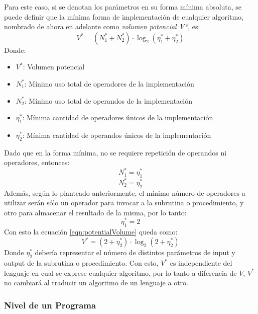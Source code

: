 \documentclass[letterpaper,12pt]{article}
\begin{document}
Para este caso, si se denotan los parámetros en su forma mínima absoluta, se puede definir que la mínima forma de implementación de cualquier algoritmo, nombrado de ahora en adelante como \textit{volumen potencial V*}, es:
\begin{equation}
  \label{eqn:potentialVolume}
  V^{*} = (N_{1}^{*} + N_{2}^{*}) \cdot \log_{2}(\eta_{1}^{*} + \eta_{2}^{*})
\end{equation}
Donde:
\begin{itemize}
  \item $V^{*}$: Volumen potencial
  \item $N_{1}^{*}$: Mínimo uso total de operadores de la implementación
  \item $N_{2}^{*}$: Mínimo uso total de operandos de la implementación
  \item $\eta_{1}^{*}$: Mínima cantidad de operadores únicos de la implementación
  \item $\eta_{2}^{*}$: Mínima cantidad de operandos únicos de la implementación
\end{itemize}
Dado que en la forma mínima, no se requiere repetición de operandos ni operadores, entonces:
\begin{equation*}
  N_{1}^{*} = \eta_{1}^{*}
\end{equation*}
\begin{equation*}
  N_{2}^{*} = \eta_{2}^{*}
\end{equation*}
Además, según lo planteado anteriormente, el mínimo número de operadores a utilizar serán sólo un operador para invocar a la subrutina o procedimiento, y otro para almacenar el resultado de la misma, por lo tanto:
\begin{equation*}
  \eta_{1}^{*} = 2
\end{equation*}
Con esto la ecuación \ref{eqn:potentialVolume} queda como:
\begin{equation}
  V^{*} = (2 + \eta_{2}^{*}) \cdot \log_{2}(2 + \eta_{2}^{*})
\end{equation}
Donde $\eta_{2}^{*}$ debería representar el número de distintos parámetros de input y output de la subrutina o procedimiento. Con esto, $V^{*}$ es independiente del lenguaje en cual se exprese cualquier algoritmo, por lo tanto a diferencia de $V$, $V^{*}$ no cambiará al traducir un algoritmo de un lenguaje a otro.

\subsubsection{Nivel de un Programa} \label{sssec:programLevel}
\end{document}
